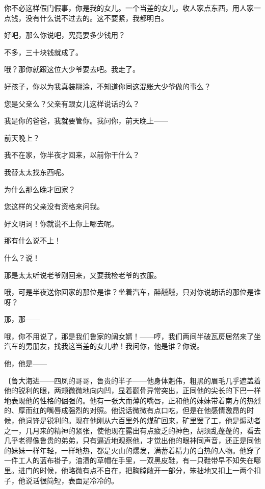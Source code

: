 你不必这样假门假事，你是我的女儿。一个当差的女儿，收人家点东西，用人家一点钱，没有什么说不过去的。这不要紧，我都明白。

好吧，那么你说吧，究竟要多少钱用？

不多，三十块钱就成了。

哦？那你就跟这位大少爷要去吧。我走了。

好孩子，你以为我真装糊涂，不知道你同这混账大少爷做的事么？

您是父亲么？父亲有跟女儿这样说话的么？

我是你的爸爸，我就要管你。我问你，前天晚上——

前天晚上？

我不在家，你半夜才回来，以前你干什么？

我替太太找东西呢。

为什么那么晚才回家？

您这样的父亲没有资格来问我。

好文明词！你就说不上你上哪去呢。

那有什么说不上！

什么？说！

那是太太听说老爷刚回来，又要我检老爷的衣服。

哦，可是半夜送你回家的那位是谁？坐着汽车，醉醺醺，只对你说胡话的那位是谁呀？

那，那——

哦，你不用说了，那是我们鲁家的阔女婿！——哼，我们两间半破瓦房居然来了坐汽车的男朋友，找我这当差的女儿啦！我问你，他是谁？你说。

他，他是——

{\fangsong〔鲁大海进——四凤的哥哥，鲁贵的半子——他身体魁伟，粗黑的眉毛几乎遮盖着他的锐利的眼，两颊微微地向内凹，显着颧骨异常突出，正同他的尖长的下巴一样地表现他的性格的倔强的。他有一张大而薄的嘴唇，正和他的妹妹带着南方的热烈的、厚而红的嘴唇成强烈的对照。他说话微微有点口吃，但是在他感情激昂的时候，他词锋是锐利的。现在他刚从六百里外的煤矿回来，矿里罢了工，他是煽动者之一，几月来的精神的紧张，使他现在露出有点疲乏的神色，胡须乱蓬蓬的，看去几乎老得像鲁贵的弟弟，只有逼近地观察他，才觉出他的眼神同声音，还正是同他的妹妹一样年轻，一样地热，都是火山的爆发，满蓄着精力的白热的人物。他穿了一件工人的蓝布褂子，油渍的草帽在手里，一双黑皮鞋，有一只鞋带早不知失在哪里。进门的时候，他略微有点不自在，把胸膛敞开一部分，笨拙地又扣上一两个扣子，他说话很简短，表面是冷冷的。}

